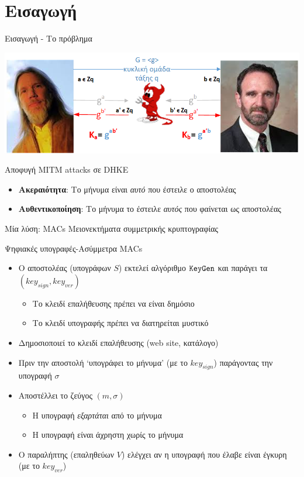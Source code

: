 \documentclass[handout]{beamer}
\begin{document}
\section{Εισαγωγή}
\begin{frame}{Εισαγωγή - Το πρόβλημα}
\begin{center}
\includegraphics[scale=0.5]{dh-mitm.png}
\end{center}
\pause
Αποφυγή MITM attacks σε DHKE
\begin{itemize}
\item \textbf{Ακεραιότητα}: Το μήνυμα είναι \emph{αυτό} που έστειλε ο αποστολέας
\item \textbf{Αυθεντικοποίηση}: Το μήνυμα το έστειλε \emph{αυτός} που φαίνεται ως αποστολέας
\end{itemize}
\pause
Μία λύση: MACs
\alert{Μειονεκτήματα συμμετρικής κρυπτογραφίας}
\end{frame}

\begin{frame}{Ψηφιακές υπογραφές-Ασύμμετρα MACs}
\begin{itemize}
\item Ο αποστολέας (υπογράφων $S$) εκτελεί αλγόριθμο $\mathtt{KeyGen}$ και παράγει τα $(key_{sign},key_{ver})$
\begin{itemize}
\item Το κλειδί επαλήθευσης πρέπει να είναι δημόσιο\\
\item Το κλειδί υπογραφής πρέπει να διατηρείται μυστικό\\
\end{itemize}
\item Δημοσιοποιεί το κλειδί επαλήθευσης (web site, κατάλογο)
\pause
\item Πριν την αποστολή `υπογράφει το μήνυμα' (με το $key_{sign}$) παράγοντας την υπογραφή $\sigma$
\pause
\item Αποστέλλει το ζεύγος $(m,\sigma)$
\begin{itemize}
\item Η υπογραφή \emph{εξαρτάται} από το μήνυμα
\item Η υπογραφή είναι άχρηστη χωρίς το μήνυμα
\end{itemize}
\pause
\item Ο παραλήπτης (επαληθεύων $V$) ελέγχει αν η υπογραφή που έλαβε είναι έγκυρη (με το $key_{ver}$)
\end{itemize}
\end{frame}
\end{document}
